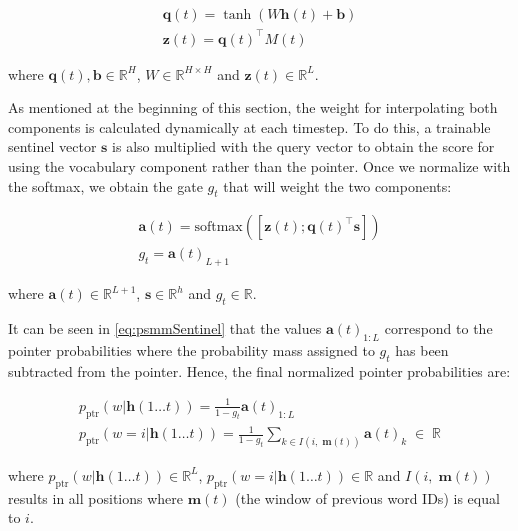 \begin{equation} \label{eq:psmmScores}
	\begin{gathered} 
		\mathbf{q}(t) = \tanh(W\mathbf{h}(t) + \mathbf{b}) \\
		\mathbf{z}(t) = \mathbf{q}(t)^{\top} M(t)
	\end{gathered}
\end{equation}

where $\mathbf{q}(t),\mathbf{b} \in \mathbb{R}^{H}$, $W \in \mathbb{R}^{H \times H}$ and $\mathbf{z}(t) \in \mathbb{R}^{L}$. 

As mentioned at the beginning of this section, the weight for interpolating both components is calculated dynamically at each timestep. To do this, a trainable sentinel vector $\mathbf{s}$ is also multiplied with the query vector to obtain the score for using the vocabulary component rather than the pointer. Once we normalize with the softmax, we obtain the gate $g_t$ that will weight the two components:

\begin{equation} \label{eq:psmmSentinel}
	\begin{gathered} 
		\mathbf{a}(t) = \text{softmax}([\mathbf{z}(t); \mathbf{q}(t)^{\top} \mathbf{s}]) \\
		g_t = \mathbf{a}(t)_{L+1}
	\end{gathered} 
\end{equation}

where $\mathbf{a}(t) \in \mathbb{R}^{L+1}$, $\mathbf{s} \in \mathbb{R}^{h}$ and $g_t \in \mathbb{R}$.

It can be seen in \autoref{eq:psmmSentinel} that the values $\mathbf{a}(t)_{1:L}$ correspond to the pointer probabilities where the probability mass assigned to $g_t$ has been subtracted from the pointer. Hence, the final normalized pointer probabilities are:

\begin{equation}
	\begin{gathered}
		p_{\text{ptr}}(w|\mathbf{h}(1\ldots t)) = \frac{1}{1-g_t}\mathbf{a}(t)_{1:L} \\
		p_{\text{ptr}}(w=i|\mathbf{h}(1\ldots t)) = \frac{1}{1-g_t}\sum_{k \in I(i, \; \mathbf{m}(t))}\mathbf{a}(t)_k \; \in \; \mathbb{R}
	\end{gathered}
\end{equation}

where $p_{\text{ptr}}(w|\mathbf{h}(1\ldots t)) \in \mathbb{R}^{L}$, $p_{\text{ptr}}(w=i|\mathbf{h}(1\ldots t)) \in \mathbb{R}$ and $I(i, \; \mathbf{m}(t))$ results in all positions where $\mathbf{m}(t)$ (the window of previous word IDs) is equal to $i$.

